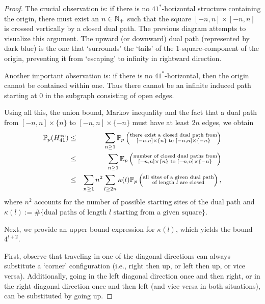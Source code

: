 \begin{proof}
            The crucial observation is: if there is no $41^*$-horizontal structure containing the origin, there must exist an $n \in \mathbb{N}_+$ such that the square $[-n, n] \times [-n, n]$ is crossed vertically by a closed dual path. The previous diagram attempts to visualize this argument. The upward (or downward) dual path (represented by dark blue) is the one that `surrounds' the `tails' of the 1-square-component of the origin, preventing it from `escaping' to infinity in rightward direction.

            Another important observation is: if there is no $41^*$-horizontal, then the origin cannot be contained within one. Thus there cannot be an infinite induced path starting at 0 in the subgraph consisting of open edges.

            Using all this, the union bound, Markov inequality and the fact that a dual path from $[-n, n] \times \{n\}$ to $[-n, n] \times \{-n\}$ must have at least $2n$ edges, we obtain
                \begin{eqnarray} \notag
                   \mathbb{P}_p(H_{41}^{*c}) & \leq & \sum_{n \geq 1} \mathbb{P}_p\left(\substack{\text{there exist a closed dual path from}\\ [-n, n] \times \{n\} \text{ to } [-n, n] \times \{-n\}}\right) \\ \notag
                               & \leq & \sum_{n \geq 1} \mathbb{E}_p\left(\substack{\text{number of closed dual paths from} \\ [-n, n] \times \{n\} \text{ to } [-n, n] \times \{-n\}}\right) \\ \label{probdualpathsareclosed}
                               & \leq & \sum_{n \geq 1} n^2 \sum_{l \geq 2n} \kappa(l) \mathbb{P}_p\left(\substack{\text{all sites of a given dual path} \\ \text{of length $l$ are closed}}\right),
                \end{eqnarray}   
            where $n^2$ accounts for the number of possible starting sites of the dual path and $\kappa(l) := \#\{\text{dual paths of length } l \text{ starting from a given square}\}$.

            Next, we provide an upper bound expression for $\kappa(l)$, which yields the bound $4^{l+2}$. 

            First, observe that traveling in one of the diagonal directions can always substitute a `corner' configuration (i.e., right then up, or left then up, or vice versa). Additionally, going in the left diagonal direction once and then right, or in the right diagonal direction once and then left (and vice versa in both situations), can be substituted by going up.


\end{proof}
